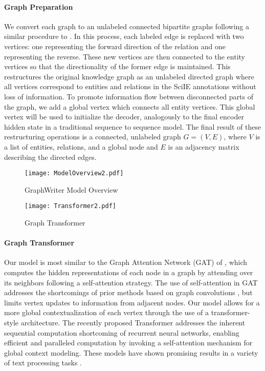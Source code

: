 \documentclass[11pt,a4paper]{article}
\begin{document}
\paragraph{Graph Preparation}
We convert each graph to an unlabeled connected bipartite graphs following a similar procedure to \citet{beck2018graph}. 
In this process, each labeled edge is replaced with two vertices: one representing the forward direction of the relation and one representing the reverse.
These new vertices are then connected to the entity vertices so that the directionality of the former edge is maintained.
This restructures the original knowledge graph as an unlabeled directed graph where all vertices correspond to entities and relations in the SciIE annotations without loss of information. 
To promote information flow between disconnected parts of the graph, we add a global vertex which connects all entity vertices. 
This global vertex will be used to initialize the decoder, analogously to the final encoder hidden state in a traditional sequence to sequence model.
The final result of these restructuring operations is a connected, unlabeled graph $G =(V,E)$, where $V$ is a list of entities, relations, and a global node and $E$ is an adjacency matrix describing the directed edges. 


\begin{figure}
    \centering
    \texttt{[image: ModelOverview2.pdf]}
    \caption{GraphWriter Model Overview}
    \label{fig:model}
\end{figure}

\begin{figure}
    \centering
    \texttt{[image: Transformer2.pdf]}
    \caption{Graph Transformer}
    \label{fig:enc}
\end{figure}
\paragraph{Graph Transformer} 
Our model is most similar to the Graph Attention Network (GAT) of \citet{velickovic2017graph}, which computes the hidden representations of each node in a graph by attending over its neighbors following a self-attention strategy.
The use of self-attention in GAT addresses the shortcomings of prior methods based on graph convolutions \cite{Defferrard2016ConvolutionalNN,Kipf2016SemiSupervisedCW}, but limits vertex updates to information from adjacent nodes. 
Our model allows for a more global contextualization of each vertex through the use of a transformer-style architecture. 
The recently proposed Transformer \cite{vaswani2017attention} addresses the inherent sequential computation shortcoming of recurrent neural networks, enabling efficient and paralleled computation by invoking a self-attention mechanism for global context modeling.
These models have shown promising results in a variety of text processing tasks \cite{radford2018improving}.
\end{document}
